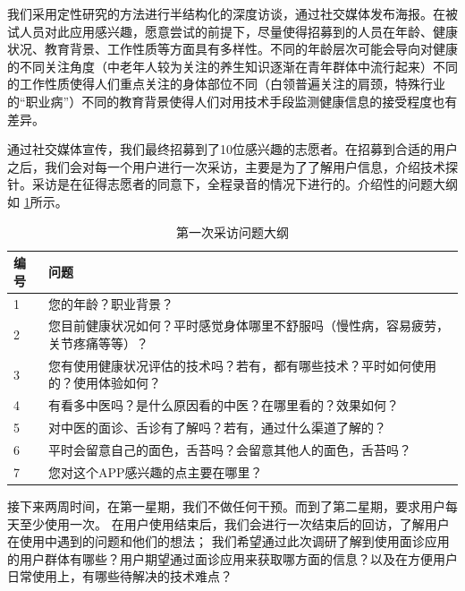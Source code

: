 我们采用定性研究的方法进行半结构化的深度访谈，通过社交媒体发布海报。在被试人员对此应用感兴趣，愿意尝试的前提下，尽量使得招募到的人员在年龄、健康状况、教育背景、工作性质等方面具有多样性。不同的年龄层次可能会导向对健康的不同关注角度（中老年人较为关注的养生知识逐渐在青年群体中流行起来）不同的工作性质使得人们重点关注的身体部位不同（白领普遍关注的肩颈，特殊行业的“职业病”）不同的教育背景使得人们对用技术手段监测健康信息的接受程度也有差异。

通过社交媒体宣传，我们最终招募到了10位感兴趣的志愿者。在招募到合适的用户之后，我们会对每一个用户进行一次采访，主要是为了了解用户信息，介绍技术探针。采访是在征得志愿者的同意下，全程录音的情况下进行的。介绍性的问题大纲如 \ref{tab:inteview_questions}所示。

\begin{table}[]
    
    
    \begin{tabular}{ll}
        \toprule
        编号 & 问题 \\
        \midrule
        1  & 您的年龄？职业背景？   \\
        2  & 您目前健康状况如何？平时感觉身体哪里不舒服吗（慢性病，容易疲劳，关节疼痛等等）？   \\
        3  &  您有使用健康状况评估的技术吗？若有，都有哪些技术？平时如何使用的？使用体验如何？  \\
         4  & 有看多中医吗？是什么原因看的中医？在哪里看的？效果如何？   \\
        5   & 对中医的面诊、舌诊有了解吗？若有，通过什么渠道了解的？   \\
         6  & 平时会留意自己的面色，舌苔吗？会留意其他人的面色，舌苔吗？\\
        7   & 您对这个APP感兴趣的点主要在哪里？\\
        \bottomrule
    \end{tabular}
    \caption{第一次采访问题大纲}
    \label{tab:inteview_questions}
\end{table}

接下来两周时间，在第一星期，我们不做任何干预。而到了第二星期，要求用户每天至少使用一次。
在用户使用结束后，我们会进行一次结束后的回访，了解用户在使用中遇到的问题和他们的想法；
我们希望通过此次调研了解到使用面诊应用的用户群体有哪些？用户期望通过面诊应用来获取哪方面的信息？以及在方便用户日常使用上，有哪些待解决的技术难点？

